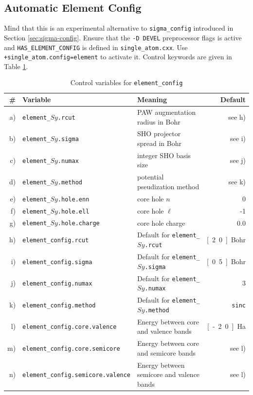 \documentclass[oribibl]{llncs}
\newcommand{\ttt}[1]{\texttt{#1}}
\begin{document}
\subsection{Automatic Element Config} \label{sec:element-config}
%
Mind that this is an experimental alternative to \ttt{sigma\_config} 
introduced in Section \ref{sec:sigma-config}.
Ensure that the \ttt{-D DEVEL} preprocessor flags is active and
\ttt{HAS\_ELEMENT\_CONFIG} is defined in \ttt{single\_atom.cxx}.
Use \ttt{+single\_atom.config=element} to activate it.
Control keywords are given in Table \ref{tab:element-config-variables}.
%
\begin{table}[h]
\caption[Element Config Variables]{
Control variables for \ttt{element\_config}
} \label{tab:element-config-variables}
\centering
\begin{tabular}{|r|l|l|r|}
\hline
  \# & Variable & Meaning & Default \\
\hline
 a) & \ttt{element\_}$Sy$\ttt{.rcut}         & \ac{PAW} augmentation radius in Bohr         & see h) \\
 b) & \ttt{element\_}$Sy$\ttt{.sigma}        & \ac{SHO} projector spread in Bohr            & see i) \\
 c) & \ttt{element\_}$Sy$\ttt{.numax}        & integer \ac{SHO} basis size                  & see j) \\
 d) & \ttt{element\_}$Sy$\ttt{.method}       & potential pseudization method                & see k) \\
 e) & \ttt{element\_}$Sy$\ttt{.hole.enn}     & core hole $n$                                & 0 \\
 f) & \ttt{element\_}$Sy$\ttt{.hole.ell}     & core hole $\ell$                             & -1 \\
 g) & \ttt{element\_}$Sy$\ttt{.hole.charge}  & core hole charge                             & 0.0 \\
 h) & \ttt{element\_config.rcut}             & Default for \ttt{element\_}$Sy$\ttt{.rcut}   & \unit[2.0]{Bohr} \\
 i) & \ttt{element\_config.sigma}            & Default for \ttt{element\_}$Sy$\ttt{.sigma}  & \unit[0.5]{Bohr} \\
 j) & \ttt{element\_config.numax}            & Default for \ttt{element\_}$Sy$\ttt{.numax}  & 3 \\
 k) & \ttt{element\_config.method}           & Default for \ttt{element\_}$Sy$\ttt{.method} & \ttt{sinc} \\
 l) & \ttt{element\_config.core.valence}     & Energy between core and valence bands        & \unit[-2.0]{Ha} \\
 m) & \ttt{element\_config.core.semicore}    & Energy between core and semicore bands       & see l) \\
 n) & \ttt{element\_config.semicore.valence} & Energy between semicore and valence bands    & see l) \\
\hline
\end{tabular}
\end{table}
\end{document}
